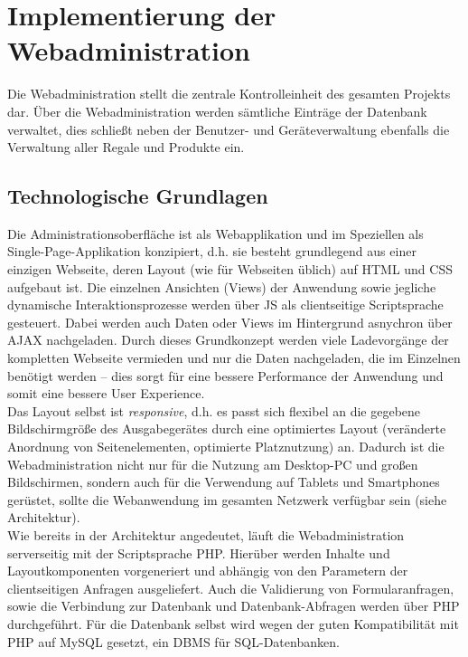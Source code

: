 \chapter{Implementierung der Webadministration}
\label{cha:impl_web}

Die Webadministration stellt die zentrale Kontrolleinheit des gesamten Projekts dar. Über die Webadministration werden sämtliche Einträge der Datenbank verwaltet, dies schließt neben der Benutzer- und Geräteverwaltung ebenfalls die Verwaltung aller Regale und Produkte ein.


\section{Technologische Grundlagen}

Die Administrationsoberfläche ist als Webapplikation und im Speziellen als Single-Page-Applikation konzipiert, d.h. sie besteht grundlegend aus einer einzigen Webseite, deren Layout (wie für Webseiten üblich) auf \acs{HTML} und \acs{CSS} aufgebaut ist. Die einzelnen Ansichten (Views) der Anwendung sowie jegliche dynamische Interaktionsprozesse werden über \acl{JS} als clientseitige Scriptsprache gesteuert. Dabei werden auch Daten oder Views im Hintergrund asnychron über \acs{AJAX} nachgeladen. Durch dieses Grundkonzept werden viele Ladevorgänge der kompletten Webseite vermieden und nur die Daten nachgeladen, die im Einzelnen benötigt werden -- dies sorgt für eine bessere Performance der Anwendung und somit eine bessere User Experience.\\

Das Layout selbst ist \emph{responsive}, d.h. es passt sich flexibel an die gegebene Bildschirmgröße des Ausgabegerätes durch eine optimiertes Layout (veränderte Anordnung von Seitenelementen, optimierte Platznutzung) an. Dadurch ist die Webadministration nicht nur für die Nutzung am Desktop-PC und großen Bildschirmen, sondern auch für die Verwendung auf Tablets und Smartphones gerüstet, sollte die Webanwendung im gesamten Netzwerk verfügbar sein (siehe Architektur).\\

Wie bereits in der Architektur angedeutet, läuft die Webadministration serverseitig mit der Scriptsprache \acs{PHP}. Hierüber werden Inhalte und Layoutkomponenten vorgeneriert und abhängig von den Parametern der clientseitigen Anfragen ausgeliefert. Auch die Validierung von Formularanfragen, sowie die Verbindung zur Datenbank und Datenbank-Abfragen werden über \ac{PHP} durchgeführt. Für die Datenbank selbst wird wegen der guten Kompatibilität mit \acs{PHP} auf MySQL gesetzt, ein \acs{DBMS} für \acs{SQL}-Datenbanken.\\

